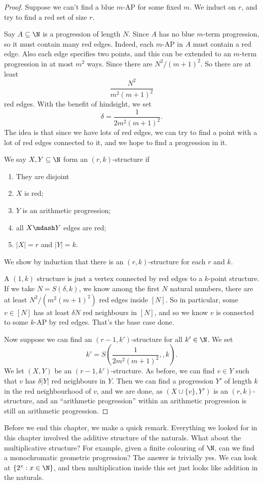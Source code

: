 \documentclass[a4paper]{article}
\begin{document}
\begin{proof}
  Suppose we can't find a blue $m$-AP for some fixed $m$. We induct on $r$, and try to find a red set of size $r$.

  Say $A \subseteq \N$ is a progression of length $N$. Since $A$ has no blue $m$-term progression, so it must contain many red edges. Indeed, each $m$-AP in $A$ must contain a red edge. Also each edge specifies two points, and this can be extended to an $m$-term progression in at most $m^2$ ways. Since there are $N^2/(m + 1)^2$. So there are at least
  \[
    \frac{N^2}{m^2(m + 1)^2}
  \]
  red edges. With the benefit of hindsight, we set
  \[
    \delta = \frac{1}{2m^2(m + 1)^2}.
  \]
  The idea is that since we have lots of red edges, we can try to find a point with a lot of red edges connected to it, and we hope to find a progression in it.

  We say $X, Y \subseteq \N$ form an $(r, k)$-structure if
  \begin{enumerate}
    \item They are disjoint
    \item $X$ is red;
    \item $Y$ is an arithmetic progression;
    \item all $X\mdash Y$ edges are red;
    \item $|X| = r$ and $|Y| = k$.
  \end{enumerate} %
  We show by induction that there is an $(r, k)$-structure for each $r$ and $k$.

  A $(1, k)$ structure is just a vertex connected by red edges to a $k$-point structure. If we take $N = S(\delta, k)$, we know among the first $N$ natural numbers, there are at least $N^2/(m^2(m + 1)^2)$ red edges inside $[N]$. So in particular, some $v \in [N]$ has at least $\delta N$ red neighbours in $[N]$, and so we know $v$ is connected to some $k$-AP by red edges. That's the base case done.

  Now suppose we can find an $(r - 1, k')$-structure for all $k' \in \N$. We set
  \[
    k' = S\left(\frac{1}{2m^2(m + 1)^2},, k\right).
  \]
  We let $(X, Y)$ be an $(r - 1, k')$-structure. As before, we can find $v \in Y$ such that $v$ has $\delta|Y|$ red neighbours in $Y$. Then we can find a progression $Y'$ of length $k$ in the red neighbourhood of $v$, and we are done, as $(X \cup \{v\}, Y')$ is an $(r, k)$-structure, and an ``arithmetic progression'' within an arithmetic progression is still an arithmetic progression.
\end{proof}
Before we end this chapter, we make a quick remark. Everything we looked for in this chapter involved the additive structure of the naturals. What about the multiplicative structure? For example, given a finite colouring of $\N$, can we find a monochromatic geometric progression? The answer is trivially yes. We can look at $\{2^x: x \in \N\}$, and then multiplication inside this set just looks like addition in the naturals.
\end{document}
